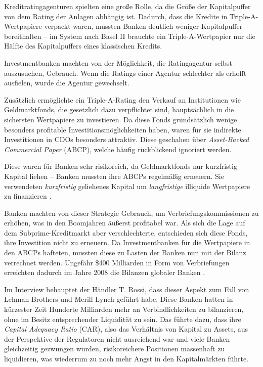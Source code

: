 \documentclass[a4paper,11pt]{report}
\begin{document}
Kreditratingagenturen spielten eine große Rolle, da
die Größe der Kapitalpuffer
von dem Rating der Anlagen abh\"angig ist.
Dadurch, dass die Kredite in Triple-A-Wertpapiere
verpackt waren, mussten Banken deutlich weniger Kapitalpuffer bereithalten
 -- im System nach Basel II brauchte ein Triple-A-Wertpapier
 nur die H\"alfte des Kapitalpuffers eines klassischen Kredits.

Investmentbanken machten von der M\"oglichkeit, die
Ratingagentur selbst auszusuchen, Gebrauch. Wenn die Ratings
einer Agentur schlechter als erhofft ausfielen, wurde die Agentur gewechselt.

Zus\"atzlich erm\"oglichte ein Triple-A-Rating
den Verkauf an Institutionen wie Geldmarktfonds,
die gesetzlich dazu
verpflichtet sind, haupts\"achlich in die sichersten Wertpapiere
zu investieren. Da diese Fonds grunds\"atzlich
wenige besonders profitable Investitionsm\"oglichkeiten haben,
waren f\"ur sie indirekte Investitionen in CDOs
besonders attraktiv. Diese geschahen \"uber
\textit{Asset-Backed Commercial Paper} (ABCP), welche h\"aufig
r\"uckblickend ignoriert werden.

Diese waren f\"ur Banken sehr risikoreich,
da Geldmarktfonds nur kurzfristig Kapital
liehen -- Banken mussten ihre ABCPs regelm\"aßig erneuern.
Sie verwendeten \emph{kurzfristig} geliehenes Kapital
um \emph{langfristige} illiquide Wertpapiere
zu finanzieren \parencite[201]{acharyar}.

Banken machten von dieser Strategie Gebrauch, um Verbriefungskommissionen
zu erh\"ohen, was in den Boomjahren \"außerst profitabel war.
Als sich die Lage auf dem Subprime-Kreditmarkt aber verschlechterte,
entschieden sich diese Fonds, ihre Investition nicht zu erneuern.
Da Investmentbanken f\"ur die Wertpapiere in den ABCPs hafteten,
mussten diese zu Lasten der Banken nun mit der Bilanz verrechnet
werden. Ungef\"ahr \$400 Milliarden
in Form von Verbriefungen erreichten dadurch
im Jahre 2008 die Bilanzen globaler Banken \parencite[570]{crottycam}.

Im Interview behauptet der H\"andler T. Rossi, dass dieser Aspekt
zum Fall von Lehman Brothers und Merill Lynch gef\"uhrt habe.
Diese Banken hatten in k\"urzester Zeit Hunderte
Milliarden mehr an Verbindlichkeiten zu bilanzieren, ohne im Besitz entsprechender
Liquidit\"at zu sein. Das f\"uhrte dazu, dass ihre \textit{
  Capital Adequacy Ratio
} (CAR), also das Verh\"altnis von Kapital zu Assets, aus der
Perspektive der Regulatoren nicht ausreichend war und viele Banken
gleichzeitig gezwungen wurden, risikoreichere Positionen massenhaft zu liquidieren,
was wiederrum zu noch mehr Angst in den Kapitalm\"arkten f\"uhrte.
\end{document}
